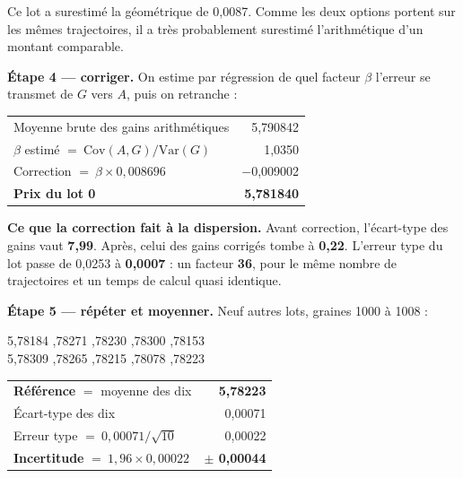 \documentclass[11pt,a4paper]{article}
\begin{document}
Ce lot a surestimé la géométrique de 0,0087. Comme les deux options portent sur
les mêmes trajectoires, il a très probablement surestimé l'arithmétique d'un
montant comparable.

\textbf{Étape 4 --- corriger.} On estime par régression de quel facteur $\beta$
l'erreur se transmet de $G$ vers $A$, puis on retranche :

\begin{center}
\small
\begin{tabular}{lr}
\toprule
Moyenne brute des gains arithmétiques & 5,790842 \\
$\beta$ estimé $=\ \mathrm{Cov}(A,G)/\mathrm{Var}(G)$ & 1,0350 \\
Correction $=\ \beta \times 0{,}008696$ & $-$0,009002 \\
\midrule
\textbf{Prix du lot 0} & \textbf{5,781840} \\
\bottomrule
\end{tabular}
\end{center}

\begin{encadre}
\textbf{Ce que la correction fait à la dispersion.} Avant correction,
l'écart-type des gains vaut \textbf{7,99}. Après, celui des gains corrigés
tombe à \textbf{0,22}. L'erreur type du lot passe de 0,0253 à \textbf{0,0007} :
un facteur \textbf{36}, pour le même nombre de trajectoires et un temps de
calcul quasi identique.
\end{encadre}

\textbf{Étape 5 --- répéter et moyenner.} Neuf autres lots, graines 1000 à
1008 :

\begin{center}\small
5,78184 ,78271 ,78230 ,78300 ,78153 \\
5,78309 ,78265 ,78215 ,78078 ,78223
\end{center}

\begin{center}
\small
\begin{tabular}{lr}
\toprule
\textbf{Référence} $=$ moyenne des dix & \textbf{5,78223} \\
Écart-type des dix & 0,00071 \\
Erreur type $=\ 0{,}00071/\sqrt{10}$ & 0,00022 \\
\textbf{Incertitude} $=\ 1{,}96 \times 0{,}00022$ & \textbf{$\pm$ 0,00044} \\
\bottomrule
\end{tabular}
\end{center}
\end{document}
